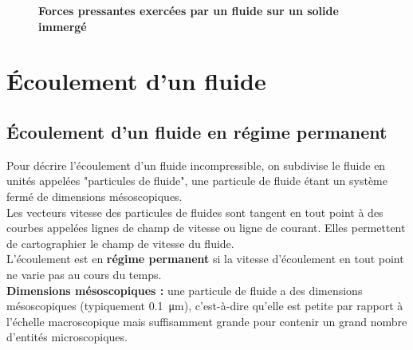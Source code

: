 \documentclass[a4paper,11pt,fleqn]{scrartcl}%
\begin{document}
    \begin{figure}[h!]
    \caption*{\textbf{Forces pressantes exercées par un fluide sur un solide immergé}}
    \centering
    \end{figure}
\section{Écoulement d'un fluide}
    \subsection{Écoulement d'un fluide en régime permanent}
    Pour décrire l'écoulement d'un fluide incompressible, on subdivise le fluide en unités appelées "particules de fluide", une particule de fluide étant un système fermé de dimensions mésoscopiques.\\
    Les vecteurs vitesse des particules de fluides sont tangent en tout point à des courbes appelées lignes de champ de vitesse ou ligne de courant. Elles permettent de cartographier le champ de vitesse du fluide.\\
    L'écoulement est en \textbf{régime permanent} si la vitesse d'écoulement en tout point ne varie pas au cours du temps.\\
    \textbf{Dimensions mésoscopiques :} une particule de fluide a des dimensions mésoscopiques (typiquement \SI{0.1}{\micro\meter}), c'est-à-dire qu'elle est petite par rapport à l'échelle macroscopique mais suffisamment grande pour contenir un grand nombre d'entités microscopiques.
\end{document}
